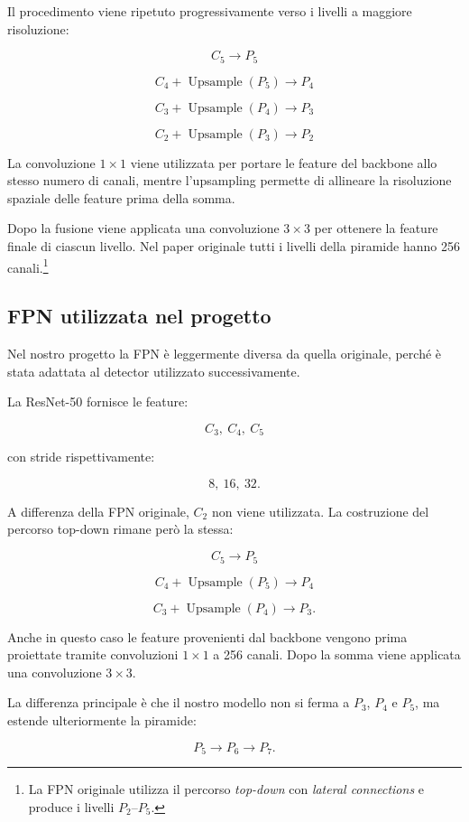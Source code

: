 Il procedimento viene ripetuto progressivamente verso i livelli a maggiore
risoluzione:

\[
C_5 \rightarrow P_5
\]

\[
C_4 + \operatorname{Upsample}(P_5) \rightarrow P_4
\]

\[
C_3 + \operatorname{Upsample}(P_4) \rightarrow P_3
\]

\[
C_2 + \operatorname{Upsample}(P_3) \rightarrow P_2
\]

La convoluzione $1\times1$ viene utilizzata per portare le feature del
backbone allo stesso numero di canali, mentre l'upsampling permette di
allineare la risoluzione spaziale delle feature prima della somma.

Dopo la fusione viene applicata una convoluzione $3\times3$ per ottenere la
feature finale di ciascun livello. Nel paper originale tutti i livelli della
piramide hanno 256 canali.\footnote{La FPN originale utilizza il percorso
\textit{top-down} con \textit{lateral connections} e produce i livelli
$P_2$--$P_5$.}

\subsection{FPN utilizzata nel progetto}

Nel nostro progetto la FPN è leggermente diversa da quella originale, perché
è stata adattata al detector utilizzato successivamente.

La ResNet-50 fornisce le feature:

\[
C_3,\ C_4,\ C_5
\]

con stride rispettivamente:

\[
8,\ 16,\ 32.
\]

A differenza della FPN originale, $C_2$ non viene utilizzata. La costruzione
del percorso top-down rimane però la stessa:

\[
C_5 \rightarrow P_5
\]

\[
C_4 + \operatorname{Upsample}(P_5) \rightarrow P_4
\]

\[
C_3 + \operatorname{Upsample}(P_4) \rightarrow P_3.
\]

Anche in questo caso le feature provenienti dal backbone vengono prima
proiettate tramite convoluzioni $1\times1$ a 256 canali. Dopo la somma viene
applicata una convoluzione $3\times3$.

La differenza principale è che il nostro modello non si ferma a $P_3$, $P_4$
e $P_5$, ma estende ulteriormente la piramide:

\[
P_5 \rightarrow P_6 \rightarrow P_7.
\]

